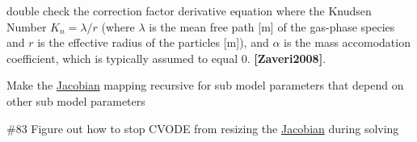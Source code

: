 
\begin{DoxyRefList}
\item[Member \mbox{\hyperlink{util_8h_af0918da54a73bf30e7079908caea2efd}{d\+\_\+transition\+\_\+regime\+\_\+correction\+\_\+factor\+\_\+d\+\_\+radius}} (double mean\+\_\+free\+\_\+path\+\_\+\+\_\+m, double radius\+\_\+\+\_\+m, double alpha)]\label{todo__todo000003}%
%
double check the correction factor derivative equation where the Knudsen Number $K_n = \lambda / r$ (where $\lambda$ is the mean free path \mbox{[}m\mbox{]} of the gas-\/phase species and $r$ is the effective radius of the particles \mbox{[}m\mbox{]}), and $ \alpha $ is the mass accomodation coefficient, which is typically assumed to equal 0. {\bfseries [Zaveri2008]}. 
\item[Member \mbox{\hyperlink{camp__solver_8h_a5b485fa25356197023889f3795888e98}{get\+\_\+jac\+\_\+init}} (\mbox{\hyperlink{struct_solver_data}{Solver\+Data}} $\ast$solver\+\_\+data)]\label{todo__todo000002}%
%
Make the \mbox{\hyperlink{struct_jacobian}{Jacobian}} mapping recursive for sub model parameters that depend on other sub model parameters  
\item[Member \mbox{\hyperlink{camp__solver_8h_a78e694c3221a39e0b96a5f40fa0fc0dd}{Jac}} (realtype t, N\+\_\+\+Vector y, N\+\_\+\+Vector deriv, SUNMatrix J, void $\ast$model\+\_\+data, N\+\_\+\+Vector tmp1, N\+\_\+\+Vector tmp2, N\+\_\+\+Vector tmp3)]\label{todo__todo000001}%
%
\#83 Figure out how to stop CVODE from resizing the \mbox{\hyperlink{struct_jacobian}{Jacobian}} during solving 
\end{DoxyRefList}